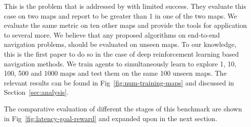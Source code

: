 \begin{description}
  This is the problem that is addressed by \cite{MiPaViICLR2017} with limited success. 
  They evaluate this case on two maps and report \LatencyOneGtOne{} to be greater than 1 in one of the two maps. We evaluate the same metric on ten other maps and provide the tools for application to several more.
    We believe that any proposed algorithms on end-to-end navigation problems, should be evaluated on unseen maps.
    To our knowledge, this is the first paper to do so in the case of deep reinforcement learning based navigation methods.
    We train agents to simultaneously learn to explore 1, 10, 100, 500 and 1000 maps and test them on the same 100 unseen maps. The relevant results can be found in Fig~\ref{fig:num-training-maps} and discussed in Section~\ref{sec:analysis}.
\end{description}

The comparative evaluation of different the stages of this benchmark are shown in Fig~\ref{fig:latency-goal-reward} and expanded upon in the next section.

%
%        


